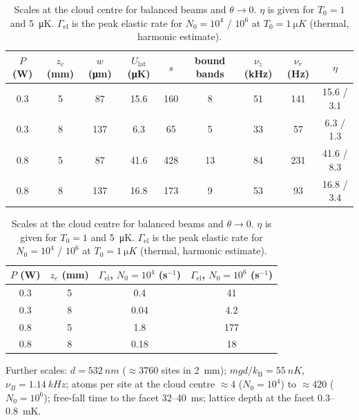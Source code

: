 \documentclass[11pt,a4paper]{article}
\newcommand{\kB}{k_\mathrm{B}}
\newcommand{\Ulat}{U_\mathrm{lat}}
\begin{document}
\begin{table}[h]
\centering
\caption{Scales at the cloud centre for balanced beams and $\theta\to0$. $\eta$ is given for $T_0=1$ and \SI{5}{\micro K}. $\Gamma_\mathrm{el}$ is the peak elastic rate for $N_0=10^4$ / $10^6$ at $T_0=\SI{1}{\micro K}$ (thermal, harmonic estimate).}
\label{tab:scales}
\small
\begin{tabular}{@{}ccccccccc@{}}
\toprule
$P$ (W) & $z_c$ (mm) & $w$ (\si{\micro m}) & $\Ulat$ (\si{\micro K}) & $s$ & bound bands & $\nu_z$ (kHz) & $\nu_r$ (Hz) & $\eta$ \\
\midrule
0.3 & 5 & 87  & 15.6 & 160 & 8  & 51 & 141 & 15.6 / 3.1 \\
0.3 & 8 & 137 & 6.3  & 65  & 5  & 33 & 57  & 6.3 / 1.3 \\
0.8 & 5 & 87  & 41.6 & 428 & 13 & 84 & 231 & 41.6 / 8.3 \\
0.8 & 8 & 137 & 16.8 & 173 & 9  & 53 & 93  & 16.8 / 3.4 \\
\bottomrule
\end{tabular}

\vspace{6pt}
\begin{tabular}{@{}cccc@{}}
\toprule
$P$ (W) & $z_c$ (mm) & $\Gamma_\mathrm{el}$, $N_0=10^4$ (s$^{-1}$) & $\Gamma_\mathrm{el}$, $N_0=10^6$ (s$^{-1}$)\\
\midrule
0.3 & 5 & 0.4 & 41 \\
0.3 & 8 & 0.04 & 4.2 \\
0.8 & 5 & 1.8 & 177 \\
0.8 & 8 & 0.18 & 18 \\
\bottomrule
\end{tabular}
\end{table}

Further scales: $d=\SI{532}{nm}$ ($\approx3760$ sites in \SI{2}{mm}); $mgd/\kB=\SI{55}{nK}$, $\nu_B=\SI{1.14}{kHz}$; atoms per site at the cloud centre $\approx4$ ($N_0=10^4$) to $\approx420$ ($N_0=10^6$); free-fall time to the facet 32--\SI{40}{ms}; lattice depth at the facet 0.3--\SI{0.8}{mK}.
\end{document}
